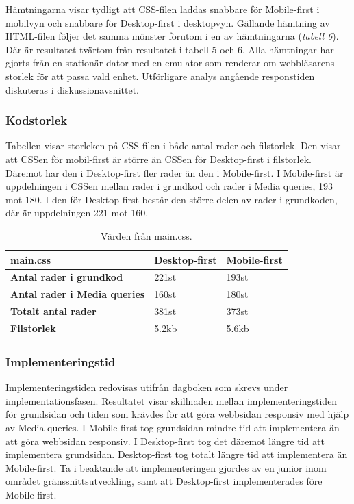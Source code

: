 \documentclass[11pt]{article}
\begin{document}
Hämtningarna visar tydligt att CSS-filen laddas snabbare för Mobile-first i mobilvyn och snabbare för Desktop-first i desktopvyn. Gällande hämtning av HTML-filen följer det samma mönster förutom i en av hämtningarna (\textit{tabell 6}). Där är resultatet tvärtom från resultatet i tabell 5 och 6. Alla hämtningar har gjorts från en stationär dator med en emulator som renderar om webbläsarens storlek för att passa vald enhet. Utförligare analys angående responstiden diskuteras i diskussionavsnittet.
\newpage
\subsubsection{Kodstorlek}

Tabellen visar storleken på CSS-filen i både antal rader och filstorlek. Den visar att CSSen för mobil-first är större än CSSen för Desktop-first i filstorlek. Däremot har den i Desktop-first fler rader än den i Mobile-first. I Mobile-first är uppdelningen i CSSen mellan rader i grundkod och rader i Media queries, 193 mot 180. I den för Desktop-first består den större delen av rader i grundkoden, där är uppdelningen 221 mot 160.

\begin{table}[H]
	\centering
	\begin{tabular}{|p{6cm}|p{2.7cm}|p{2.4cm}|}
	\hline
	\textbf{main.css}&\textbf{Desktop-first}&\textbf{Mobile-first}\\ \hline
	\textbf{Antal rader i grundkod}&221st&193st\\ \hline
	\textbf{Antal rader i Media queries}&160st&180st\\ \hline
	\textbf{Totalt antal rader}&381st&373st\\ \hline
	\textbf{Filstorlek}&5.2kb&5.6kb\\ \hline
	\end{tabular}
    \caption {Värden från main.css.}
\end{table}

\subsubsection{Implementeringstid}

Implementeringstiden redovisas utifrån dagboken som skrevs under implementationsfasen. Resultatet visar skillnaden mellan implementeringstiden för grundsidan och tiden som krävdes för att göra webbsidan responsiv med hjälp av Media queries. I Mobile-first tog grundsidan mindre tid att implementera än att göra webbsidan responsiv. I Desktop-first tog det däremot längre tid att implementera grundsidan. Desktop-first tog totalt längre tid att implementera än Mobile-first. Ta i beaktande att implementeringen gjordes av en junior inom området gränssnittsutveckling, samt att Desktop-first implementerades före Mobile-first.
\end{document}
